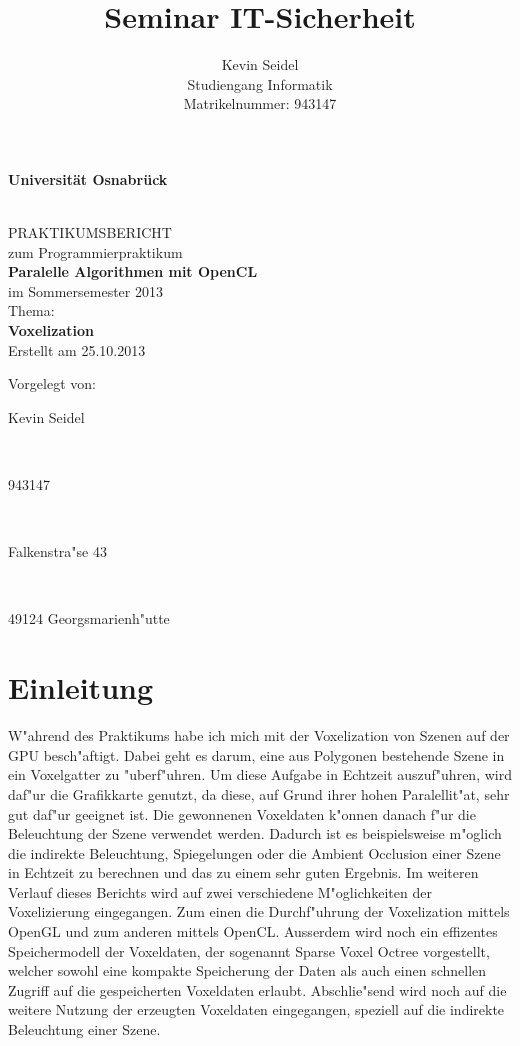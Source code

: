 \documentclass[a4paper, 12pt]{scrartcl}
\title{Seminar IT-Sicherheit}
\author{Kevin Seidel \\ Studiengang Informatik \\ Matrikelnummer: 943147}
\begin{document}
\begin{titlepage}
\begin{center}
\vspace*{1.5cm}
\begin{Large}
\textbf{Universität Osnabrück}
\end{Large}

\noindent\hrulefill
\\[3.5cm]
PRAKTIKUMSBERICHT \\[1cm]
zum Programmierpraktikum \\[1cm]
\textbf{Paralelle Algorithmen mit OpenCL} \\[1.5cm]
im Sommersemester 2013 \\[1.5cm]
Thema: \\[0.5cm]
\textbf{Voxelization} \\[2cm]
Erstellt am 25.10.2013
\end{center}
\vfill
\begin{flushleft}
Vorgelegt von: 
\hfill \parbox{46mm}{Kevin Seidel} \\
\hfill \parbox{46mm}{943147} \\
\hfill \parbox{46mm}{Falkenstra"se 43} \\
\hfill \parbox{46mm}{49124 Georgsmarienh"utte}
\end{flushleft}
\end{titlepage}

\newpage

\setcounter{page}{2}
\tableofcontents

\newpage
{}
\setcounter{page}{1}

\section{Einleitung}
W"ahrend des Praktikums habe ich mich mit der Voxelization von Szenen auf der GPU besch"aftigt. Dabei geht es darum, eine aus Polygonen bestehende Szene in ein Voxelgatter zu "uberf"uhren. Um diese Aufgabe in Echtzeit auszuf"uhren, wird daf"ur die Grafikkarte genutzt, da diese, auf Grund ihrer hohen Paralellit"at, sehr gut daf"ur geeignet ist.
Die gewonnenen Voxeldaten k"onnen danach f"ur die Beleuchtung der Szene verwendet werden. Dadurch ist es beispielsweise m"oglich die indirekte Beleuchtung, Spiegelungen oder die Ambient Occlusion einer Szene in Echtzeit zu berechnen und das zu einem sehr guten Ergebnis.
Im weiteren Verlauf dieses Berichts wird auf zwei verschiedene M"oglichkeiten der Voxelizierung eingegangen. Zum einen die Durchf"uhrung der Voxelization mittels OpenGL und zum anderen mittels OpenCL.
Ausserdem wird noch ein effizentes Speichermodell der Voxeldaten, der sogenannt Sparse Voxel Octree vorgestellt, welcher sowohl eine kompakte Speicherung der Daten als auch einen schnellen Zugriff auf die gespeicherten Voxeldaten erlaubt. 
Abschlie"send wird noch auf die weitere Nutzung der erzeugten Voxeldaten eingegangen, speziell auf die indirekte Beleuchtung einer Szene.
\end{document}
